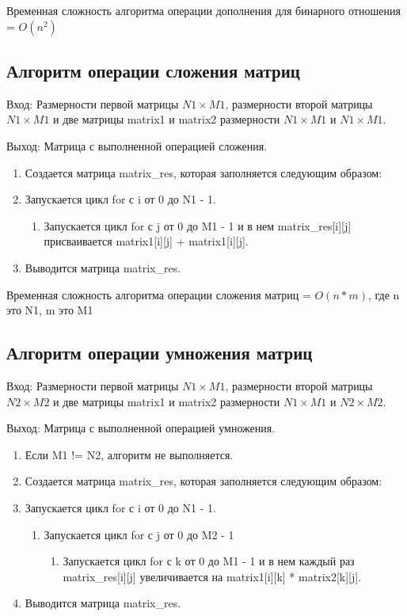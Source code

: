 \documentclass[bachelor, och, labwork]{shiza}
\begin{document}
	Временная сложность алгоритма операции дополнения для бинарного отношения = $O(n^2)$

	\subsection{Алгоритм операции сложения матриц}
	
			$\textit{Вход:}$ Размерности первой матрицы $N1 \times M1$, размерности второй матрицы $N1 \times M1$ и две матрицы matrix1 и matrix2 размерности $N1 \times M1$ и $N1 \times M1$.

			$\textit{Выход:}$  Матрица с выполненной операцией сложения.		
	
	\begin{enumerate} 
		\item Создается матрица matrix\_res, которая заполняется следующим образом:
		\item Запускается цикл for с i от 0 до N1 - 1.
		\begin{enumerate} 
			\item Запускается цикл for с j от 0 до M1 - 1 и в нем   matrix\_res[i][j] присваивается matrix1[i][j] + matrix1[i][j].
		\end{enumerate}
		\item Выводится матрица matrix\_res.
	\end{enumerate} 
	
	Временная сложность алгоритма операции сложения матриц = $O(n * m)$, где n это N1, m это M1
	
	\subsection{Алгоритм операции умножения матриц}

			$\textit{Вход:}$ Размерности первой матрицы $N1 \times M1$, размерности второй матрицы $N2 \times M2$ и две матрицы matrix1 и matrix2 размерности $N1 \times M1$ и $N2 \times M2$.

			$\textit{Выход:}$  Матрица с выполненной операцией умножения.	

	\begin{enumerate} 
		\item Если M1 != N2, алгоритм не выполняется.
		\item Создается матрица matrix\_res, которая заполняется следующим образом:
		\item Запускается цикл for с i от 0 до N1 - 1.
		\begin{enumerate} 
			\item Запускается цикл for с j от 0 до M2 - 1
			\begin{enumerate} 
				\item Запускается цикл for с k от 0 до M1 - 1 и в нем каждый раз matrix\_res[i][j] увеличивается на
				matrix1[i][k] * matrix2[k][j].
			\end{enumerate}
		\end{enumerate}
		\item Выводится матрица matrix\_res.
	\end{enumerate} 
	
\end{document}
